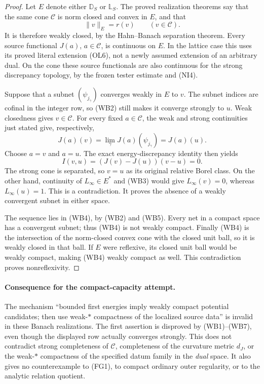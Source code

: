 \begin{proof}
Let $E$ denote either $\mathbb D_S$ or $\mathbb L_S$.
The proved realization theorems say that the same cone
$\mathscr C$ is norm closed and convex in $E$, and that
\[
                         \|v\|_E=r(v)\qquad(v\in\mathscr C).
 \tag{WB5}
\]
It is therefore weakly closed, by the Hahn--Banach
separation theorem. Every source functional $J(a)$,
$a\in\mathscr C$, is continuous on $E$. In the lattice
case this uses its proved literal extension (OL6),
not a newly assumed extension of an arbitrary dual.
On the cone these source functionals are also continuous
for the strong discrepancy topology, by the frozen
tester estimate and (NI4).

Suppose that a subnet $(\psi_{j_\gamma})$ converges
weakly in $E$ to $v$. The subnet indices are cofinal
in the integer row, so (WB2) still makes it converge
strongly to $u$. Weak closedness gives $v\in\mathscr C$.
For every fixed $a\in\mathscr C$, the weak and strong
continuities just stated give, respectively,
\[
      J(a)(v)=\lim_\gamma J(a)(\psi_{j_\gamma})=J(a)(u).
 \tag{WB6}
\]
Choose $a=v$ and $a=u$. The exact energy-discrepancy
identity then yields
\[
              I(v,u)=(J(v)-J(u))(v-u)=0.
 \tag{WB7}
\]
The strong cone is separated, so $v=u$ as its original
relative Borel class. On the other hand, continuity of
$L_\infty\in E^*$ and (WB3) would give
$L_\infty(v)=0$, whereas $L_\infty(u)=1$. This is a
contradiction. It proves the absence of a weakly
convergent subnet in either space.

The sequence lies in (WB4), by (WB2) and (WB5).
Every net in a compact space has a convergent subnet;
thus (WB4) is not weakly compact. Finally (WB4) is
the intersection of the norm-closed convex cone with
the closed unit ball, so it is weakly closed in that
ball. If $E$ were reflexive, its closed unit ball
would be weakly compact, making (WB4) weakly compact
as well. This contradiction proves nonreflexivity.
\end{proof}

\paragraph{Consequence for the compact-capacity attempt.}
The mechanism ``bounded first energies imply weakly compact
potential candidates; then use weak-$*$ compactness of the
localized source data'' is invalid in these Banach realizations.
The first assertion is disproved by (WB1)--(WB7), even though
the displayed row actually converges strongly. This does not
contradict strong completeness of $\mathscr C$, completeness
of the curvature metric $d_J$, or the weak-$*$ compactness
of the specified datum family in the \emph{dual} space.
It also gives no counterexample to (FG1), to compact ordinary
outer regularity, or to the analytic relation quotient.

